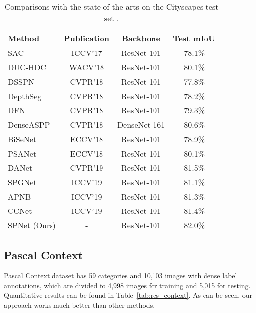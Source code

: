 \documentclass[final]{cvpr}
\begin{document}
\begin{table}[t]
  \centering
  \small
  \setlength\tabcolsep{1.9mm}
  \renewcommand\arraystretch{1.0}
  \begin{tabular}{lccc} \toprule[0.7pt]
    Method & Publication & Backbone & Test mIoU \\ \midrule[0.5pt]\midrule[0.5pt]
SAC \cite{zhang2017scale} & ICCV'17 & ResNet-101 & 78.1\% \\
    DUC-HDC \cite{wang2018understanding} & WACV'18 & ResNet-101 & 80.1\% \\
    DSSPN \cite{liang2018dynamic} & CVPR'18 & ResNet-101 & 77.8\% \\
    DepthSeg \cite{kong2018recurrent} & CVPR'18 & ResNet-101 & 78.2\% \\
    DFN \cite{yu2018learning} & CVPR'18 & ResNet-101 & 79.3\% \\
    DenseASPP \cite{yang2018denseaspp}  & CVPR'18 & DenseNet-161 & 80.6\%  \\
    BiSeNet \cite{yu2018bisenet}  & ECCV'18 & ResNet-101 & 78.9\%  \\
    PSANet \cite{zhao2018psanet}  & ECCV'18 & ResNet-101 & 80.1\%  \\
    DANet \cite{fu2019dual}  & CVPR'19 & ResNet-101 & 81.5\%  \\
    SPGNet \cite{cheng2019spgnet} & ICCV'19 & ResNet-101 & 81.1\% \\
    APNB \cite{zhu2019asymmetric} & ICCV'19 & ResNet-101 & 81.3\% \\
    CCNet \cite{huang2018ccnet} & ICCV'19 & ResNet-101 & 81.4\% \\ \midrule[0.5pt]\midrule[0.5pt]
    SPNet (Ours) & - & ResNet-101 & 82.0\% \\
\bottomrule[0.7pt]
\end{tabular}
  \vspace{0pt}
  \caption{Comparisons with the state-of-the-arts on the Cityscapes test set \cite{cordts2016cityscapes}.}
  \label{tab:test_city}
  \vspace{-10pt}
\end{table}

\subsection{Pascal Context}


Pascal Context dataset \cite{mottaghi2014role} has 59 categories and 10,103 images with dense label annotations,
which are divided to 4,998 images for training and 5,015 for testing.
Quantitative results can be found in Table~\ref{tab:res_context}.
As can be seen, our approach works much better than other methods.
\end{document}
